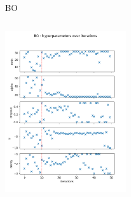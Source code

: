 \begin{frame}[allowframebreaks]{BO}
\begin{columns}
        \begin{column}{0.4\textwidth}
            \includegraphics[height = 7cm]{imgs/plots/exp12_variables_over_time.png}
            
            
        \end{column}
    \end{columns}  
\end{frame}


